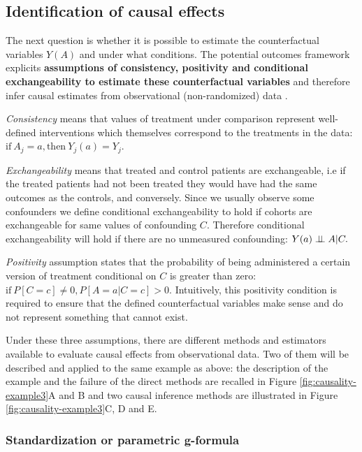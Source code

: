 \documentclass[a4paper,12pt,twoside,onecolumn,openright,final,oldfontcommands]{memoir}
\begin{document}
\subsection{Identification of causal
effects}\label{causal-identification-simple}

The next question is whether it is possible to estimate the
counterfactual variables \(Y(A)\) and under what conditions. The
potential outcomes framework explicits \textbf{assumptions of
consistency, positivity and conditional exchangeability to estimate
these counterfactual variables} and therefore infer causal estimates
from observational (non-randomized) data
\citep[\citet{hernan2020causal}]{rubin1974estimating}.

\emph{Consistency} means that values of treatment under comparison
represent well-defined interventions which themselves correspond to the
treatments in the data:
\(\textrm{if} \: A_j=a, \textrm{then} \: Y_j(a)=Y_j.\)

\emph{Exchangeability} means that treated and control patients are
exchangeable, i.e if the treated patients had not been treated they
would have had the same outcomes as the controls, and conversely. Since
we usually observe some confounders we define conditional
exchangeability to hold if cohorts are exchangeable for same values of
confounding \(C\). Therefore conditional exchangeability will hold if
there are no unmeasured confounding: \(Y(a) \perp \!\!\! \perp A | C.\)

\emph{Positivity} assumption states that the probability of being
administered a certain version of treatment conditional on \(C\) is
greater than zero: \(\textrm{if} \: P[C=c] \neq 0, P[A=a | C=c] >0.\)
Intuitively, this positivity condition is required to ensure that the
defined counterfactual variables make sense and do not represent
something that cannot exist.

Under these three assumptions, there are different methods and
estimators available to evaluate causal effects from observational data.
Two of them will be described and applied to the same example as above:
the description of the example and the failure of the direct methods are
recalled in Figure \ref{fig:causality-example3}A and B and two causal
inference methods are illustrated in Figure
\ref{fig:causality-example3}C, D and E.

\subsubsection{Standardization or parametric
g-formula}\label{std-classic}
\end{document}

